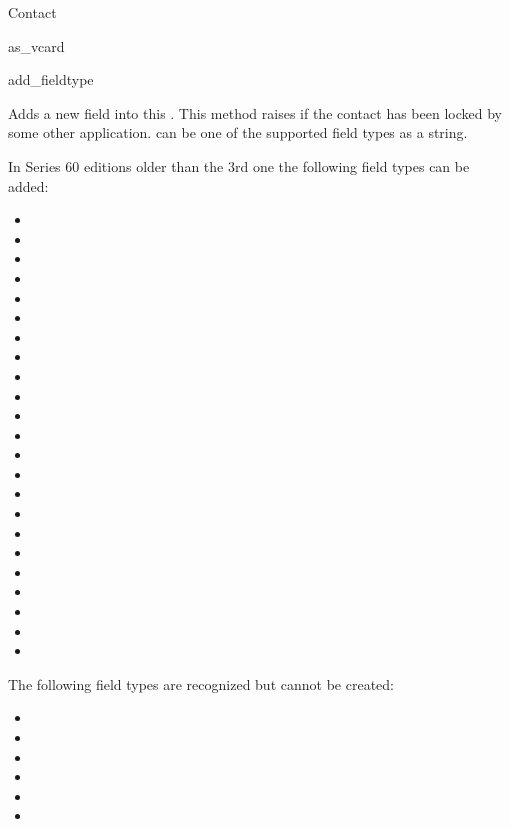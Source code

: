 \begin{classdesc*}{Contact}
\begin{methoddesc}[Contact]{as_vcard}{}
\end{methoddesc}

\begin{methoddesc}[Contact]{add_field}{type }

Adds a new field into this . This method raises 
 if the contact has been locked by some other 
application.  can be one of the supported field types as a 
string. 

In Series 60 editions older than the 3rd one the following field types can 
be added:

\begin{itemize}
\item {}
\item {}
\item {}
\item {}
\item {}
\item {}
\item {}
\item {}
\item {}
\item {}
\item {}
\item {}
\item {}
\item {}
\item {}
\item {}
\item {}
\item {}
\item {}
\item {}
\item {}
\item {}
\item {}
\end{itemize}

The following field types are recognized but cannot be created:

\begin{itemize}
\item {}
\item {}
\item {}
\item {}
\item {}
\item {}
\end{itemize}



\end{methoddesc}
\end{classdesc*}
